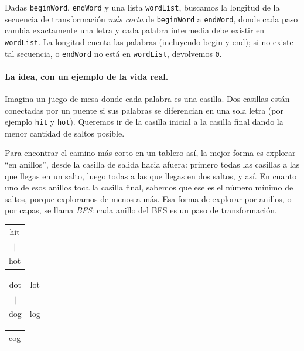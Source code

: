 
Dadas \texttt{beginWord}, \texttt{endWord} y una lista \texttt{wordList},
buscamos la longitud de la secuencia de transformación \emph{más corta} de
\texttt{beginWord} a \texttt{endWord}, donde cada paso cambia exactamente una
letra y cada palabra intermedia debe existir en \texttt{wordList}. La
longitud cuenta las palabras (incluyendo begin y end); si no existe tal
secuencia, o \texttt{endWord} no está en \texttt{wordList}, devolvemos
\texttt{0}.

\paragraph{La idea, con un ejemplo de la vida real.} Imagina un juego de mesa
donde cada palabra es una casilla. Dos casillas están conectadas por un puente
si sus palabras se diferencian en una sola letra (por ejemplo \texttt{hit} y
\texttt{hot}). Queremos ir de la casilla inicial a la casilla final dando la
menor cantidad de saltos posible.

Para encontrar el camino más corto en un tablero así, la mejor forma es
explorar ``en anillos'', desde la casilla de salida hacia afuera: primero todas
las casillas a las que llegas en un salto, luego todas a las que llegas en dos
saltos, y así. En cuanto uno de esos anillos toca la casilla final, sabemos que
ese es el número mínimo de saltos, porque exploramos de menos a más. Esa forma
de explorar por anillos, o por capas, se llama \emph{BFS}:
cada anillo del BFS es un paso de transformación.

\begin{center}
\ttfamily
\begin{tabular}{c}
hit \\
$|$ \\
hot \\
\end{tabular}
\quad
\begin{tabular}{cc}
dot & lot \\
$|$ & $|$ \\
dog & log \\
\end{tabular}
\quad
\begin{tabular}{c}
cog \\
\end{tabular}
\end{center}

